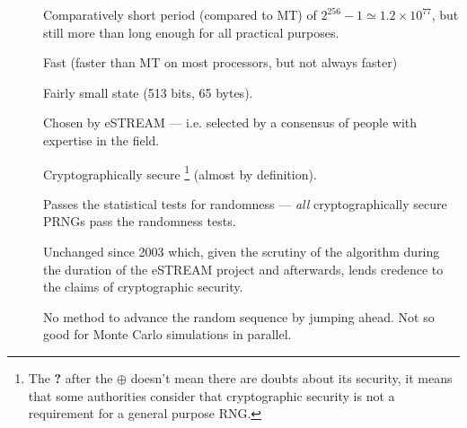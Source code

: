 \documentclass[letterpaper,12pt]{article}
\begin{document}
\begin{description}
\item[\PossiblyGoodThing]
  Comparatively short period (compared to MT) of
  $2^{256}-1 \simeq 1.2 \times 10^{77}$,
  but still more than long enough for all practical purposes.
\item[\GoodThing]
  Fast (faster than MT on most processors, but not always
  faster\cite{Bernstein:cypherSpeed})
\item[\GoodThing]
  Fairly small state (513 bits, 65 bytes).
\item[\GoodThing]
  Chosen by eSTREAM --- i.e. selected by a consensus of people with
  expertise in the field.
\item[\PossiblyGoodThing]
  Cryptographically secure%
  \footnote{
    The {\bf ?} after the $\oplus$ doesn't mean there are doubts about its
    security, it means that some authorities consider that cryptographic
    security is not a requirement for a general purpose RNG.
    }
  (almost by definition).
\item[\GoodThing]
  Passes the statistical tests for randomness --- {\em all}
  cryptographically secure PRNGs pass the randomness tests.
\item[\GoodThing]
  Unchanged since 2003 which, given the scrutiny of the algorithm during
  the duration of the eSTREAM project and afterwards, lends
  credence to the claims of cryptographic security.
\item[\PossiblyBadThing]
  No method to advance the random sequence by jumping ahead. Not so good
  for Monte Carlo simulations in parallel.

\end{description}

\end{document}
